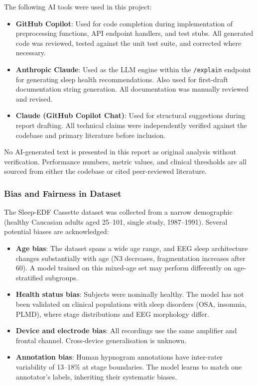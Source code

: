 \documentclass[10pt]{article}
\begin{document}
The following AI tools were used in this project:
\begin{itemize}
  \item \textbf{GitHub Copilot}: Used for code completion during implementation of preprocessing functions, API endpoint handlers, and test stubs. All generated code was reviewed, tested against the unit test suite, and corrected where necessary.
  \item \textbf{Anthropic Claude}: Used as the LLM engine within the \texttt{/explain} endpoint for generating sleep health recommendations. Also used for first-draft documentation string generation. All documentation was manually reviewed and revised.
  \item \textbf{Claude (GitHub Copilot Chat)}: Used for structural suggestions during report drafting. All technical claims were independently verified against the codebase and primary literature before inclusion.
\end{itemize}

No AI-generated text is presented in this report as original analysis without verification. Performance numbers, metric values, and clinical thresholds are all sourced from either the codebase or cited peer-reviewed literature.

\subsubsection{Bias and Fairness in Dataset}
\label{sec:biasFairness}

The Sleep-EDF Cassette dataset was collected from a narrow demographic (healthy Caucasian adults aged 25--101, single study, 1987--1991). Several potential biases are acknowledged:

\begin{itemize}
  \item \textbf{Age bias}: The dataset spans a wide age range, and EEG sleep architecture changes substantially with age (N3 decreases, fragmentation increases after 60). A model trained on this mixed-age set may perform differently on age-stratified subgroups.
  \item \textbf{Health status bias}: Subjects were nominally healthy. The model has not been validated on clinical populations with sleep disorders (OSA, insomnia, PLMD), where stage distributions and EEG morphology differ.
  \item \textbf{Device and electrode bias}: All recordings use the same amplifier and frontal channel. Cross-device generalisation is unknown.
  \item \textbf{Annotation bias}: Human hypnogram annotations have inter-rater variability of 13--18\% at stage boundaries. The model learns to match one annotator's labels, inheriting their systematic biases.
\end{itemize}
\end{document}
